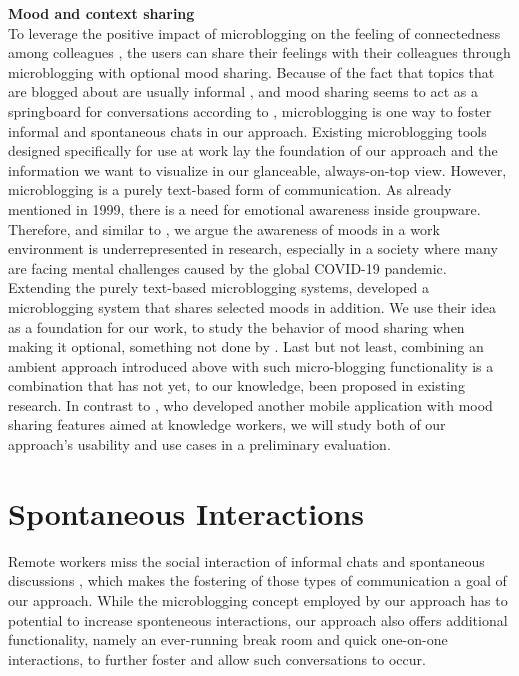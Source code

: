 \medskip\noindent\textbf{Mood and context sharing}\\
To leverage the positive impact of microblogging on the feeling of connectedness among colleagues \autocite{dullemond2013fixing}, the users can share their feelings with their colleagues through microblogging with optional mood sharing. Because of the fact that topics that are blogged about are usually informal \autocite{ehrlich2010microblogging}, and mood sharing seems to act as a springboard for conversations according to \textcite{church2010study}, microblogging is one way to foster informal and spontaneous chats in our approach. Existing microblogging tools designed specifically for use at work lay the foundation of our approach and the information we want to visualize in our glanceable, always-on-top view. However, microblogging is a purely text-based form of communication. As \textcite{garcia1999emotional} already mentioned in 1999, there is a need for emotional awareness inside groupware. Therefore, and similar to \autocite{mora2011supporting}, we argue the awareness of moods in a work environment is underrepresented in research, especially in a society where many are facing mental challenges caused by the global COVID-19 pandemic. Extending the purely text-based microblogging systems, \textcite{dullemond2013fixing} developed a microblogging system that shares selected moods in addition. We use their idea as a foundation for our work, to study the behavior of mood sharing when making it optional, something not done by \textcite{dullemond2013fixing}. Last but not least, combining an ambient approach introduced above with such micro-blogging functionality is a combination that has not yet, to our knowledge, been proposed in existing research. In contrast to \textcite{saari2008mobile}, who developed another mobile application with mood sharing features aimed at knowledge workers, we will study both of our approach's usability and use cases in a preliminary evaluation.

\section{Spontaneous Interactions}
Remote workers miss the social interaction of informal chats and spontaneous discussions \autocite{cooper2002telecommuting}, which makes the fostering of those types of communication a goal of our approach. While the microblogging concept employed by our approach has to potential to increase sponteneous interactions, our approach also offers additional functionality, namely an ever-running break room and quick one-on-one interactions, to further foster and allow such conversations to occur.


